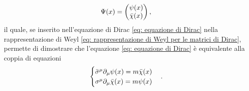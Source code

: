 \begin{equation}
    \Psi(x) = 
    \begin{pmatrix}
        \psi(x) \\
        \bar{\chi}(x)
    \end{pmatrix},
\end{equation}
il quale, se inserito nell'equazione di Dirac \eqref{eq: equazione di Dirac} nella rappresentazione di Weyl \eqref{eq: rappresentazione di Weyl per le matrici di Dirac}, permette di dimostrare che l'equazione \eqref{eq: equazione di Dirac} è equivalente alla coppia di equazioni 
\begin{equation}
    \begin{cases}
        \bar{\sigma}^\mu\partial_\mu\psi(x) = m\bar{\chi}(x) \\
        \sigma^\mu\partial_\mu\bar{\chi}(x) = m\psi(x)
    \end{cases}.
\end{equation}

